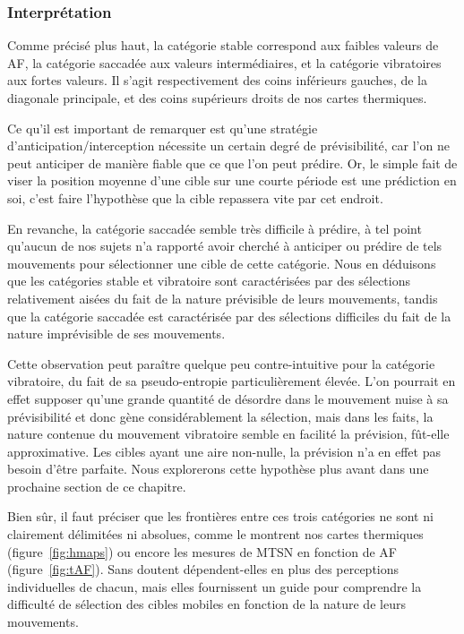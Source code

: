 	\subsubsection{Interprétation}
	Comme précisé plus haut, la catégorie stable correspond aux faibles valeurs de AF, la catégorie saccadée aux valeurs intermédiaires, et la catégorie vibratoires aux fortes valeurs. Il s'agit respectivement des coins inférieurs gauches, de la diagonale principale, et des coins supérieurs droits de nos cartes thermiques.
	
	Ce qu'il est important de remarquer est qu'une stratégie d'anticipation/interception nécessite un certain degré de prévisibilité, car l'on ne peut anticiper de manière fiable que ce que l'on peut prédire. Or, le simple fait de viser la \og position moyenne \fg{} d'une cible sur une courte période est une prédiction en soi, c'est faire l'hypothèse que la cible repassera vite par cet endroit.
	
	En revanche, la catégorie saccadée semble très difficile à prédire, à tel point qu'aucun de nos sujets n'a rapporté avoir cherché à anticiper ou prédire de tels mouvements pour sélectionner une cible de cette catégorie. Nous en déduisons que les catégories stable et vibratoire sont caractérisées par des sélections relativement aisées du fait de la nature prévisible de leurs mouvements, tandis que la catégorie saccadée est caractérisée par des sélections difficiles du fait de la nature imprévisible de ses mouvements.
	
	Cette observation peut paraître quelque peu contre-intuitive pour la catégorie vibratoire, du fait de sa pseudo-entropie particulièrement élevée. L'on pourrait en effet supposer qu'une grande quantité de désordre dans le mouvement nuise à sa prévisibilité et donc gène considérablement la sélection, mais dans les faits, la nature \og contenue \fg{} du mouvement vibratoire semble en facilité la prévision, fût-elle approximative. Les cibles ayant une aire non-nulle, la prévision n'a en effet pas besoin d'être parfaite. Nous explorerons cette hypothèse plus avant dans une prochaine section de ce chapitre.
	
	Bien sûr, il faut préciser que les frontières entre ces trois catégories ne sont ni clairement délimitées ni absolues, comme le montrent nos cartes thermiques (figure~\ref{fig:hmaps}) ou encore les mesures de MTSN en fonction de AF (figure~\ref{fig:tAF}). Sans doutent dépendent-elles en plus des perceptions individuelles de chacun, mais elles fournissent un guide pour comprendre la difficulté de sélection des cibles mobiles en fonction de la nature de leurs mouvements.
	
